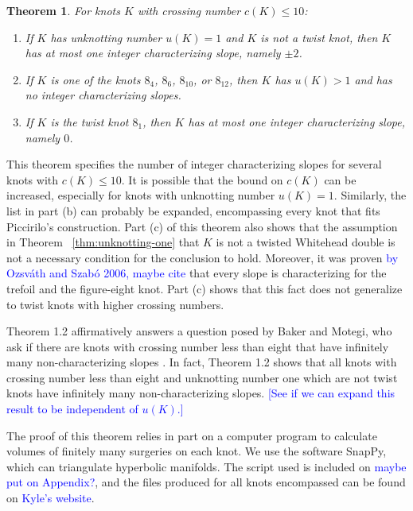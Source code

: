 \documentclass[11pt,usenames,dvipsnames,reqno]{amsart}
\newtheorem{theorem}{Theorem}
\numberwithin{theorem}{section}
\theoremstyle{ex}
\theoremstyle{rem}
\def\kh#1{\textcolor{Blue}{#1}}
\begin{document}
\begin{theorem}\label{thm:low-crossing} For knots $K$ with crossing number $c(K) \leq 10$:
	\begin{enumerate}[label=\normalfont \bf (\alph*)]
		\item If $K$ has unknotting number $u(K)=1$ and $K$ is not a twist knot, then $K$ has at most one integer characterizing slope, namely $\pm 2$.
		\item If $K$ is one of the knots $8_4$, $8_6$, $8_{10}$, or $8_{12}$, then $K$ has $u(K)>1$ and has no integer characterizing slopes.
		\item If $K$ is the twist knot $8_1$, then $K$ has at most one integer characterizing slope, namely $0$.
	\end{enumerate}
\end{theorem}

This theorem specifies the number of integer characterizing slopes for several knots with $c(K) \leq 10$. It is possible that the bound on $c(K)$ can be increased, especially for knots with unknotting number $u(K) = 1$. Similarly, the list in part (b) can probably be expanded, encompassing every knot that fits Piccirilo's construction. Part (c) of this theorem also shows that the assumption in Theorem ~\ref{thm:unknotting-one} that $K$ is not a twisted Whitehead double is not a necessary condition for the conclusion to hold. Moreover, it was proven \kh{by Ozsv\'{a}th and Szab\'{o} 2006, maybe cite}  that every slope is characterizing for the trefoil and the figure-eight knot. Part (c) shows that this fact does not generalize to twist knots with higher crossing numbers.

Theorem 1.2 affirmatively answers a question posed by Baker and Motegi, who ask if there are knots with crossing number less than eight that have infinitely many non-characterizing slopes \cite[Question~1.7]{baker-motegi}. In fact, Theorem 1.2 shows that all knots with crossing number less than eight and unknotting number one which are not twist knots have infinitely many non-characterizing slopes. \kh{[See if we can expand this result to be independent of $u(K)$.]}

The proof of this theorem relies in part on a computer program to calculate volumes of finitely many surgeries on each knot. We use the software SnapPy, which can triangulate hyperbolic manifolds. The script used is included on \kh{maybe put on Appendix?}, and the files produced for all knots encompassed can be found on \kh{Kyle's website}.
\end{document}
